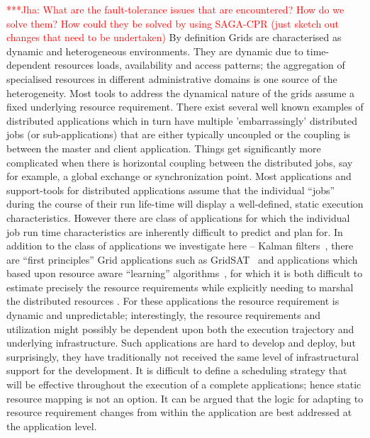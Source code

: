 \documentclass[conference,final]{IEEEtran}
\newcommand{\jhanote}[1]{ {\textcolor{red} { ***Jha: #1 }}}
\begin{document}
\jhanote{What are the fault-tolerance issues that are encountered?
  How do we solve them? How could they be solved by using SAGA-CPR
  (just sketch out changes that need to be undertaken)}
By definition Grids are characterised as dynamic and heterogeneous
environments.  They are dynamic due to time-dependent resources loads,
availability and access patterns; the aggregation of specialised
resources in different administrative domains is one source of the
heterogeneity.  Most tools to address the dynamical nature of the
grids assume a fixed underlying resource requirement.  There exist
several well known examples of distributed applications which in turn
have multiple 'embarrassingly' distributed jobs (or sub-applications)
that are either typically uncoupled or the coupling is between the
master and client application.  Things get significantly more
complicated when there is horizontal coupling between the distributed
jobs, say for example, a global exchange or synchronization point.
Most applications and support-tools for distributed applications
assume that the individual ``jobs'' during the course of their run
life-time will display a well-defined, static execution
characteristics.  However there are class of applications for which
the individual job run time characteristics are inherently difficult
to predict and plan for.  In addition to the class of applications we
investigate here -- Kalman filters~\cite{DataAssim, KalmanPaper},
there are ``first principles'' Grid applications such as
GridSAT~\cite{gridsat03} and applications which based upon resource
aware ``learning'' algorithms~\cite{ majority_voting}, for which it is
both difficult to estimate precisely the resource requirements while
explicitly needing to marshal the distributed resources . For these
applications the resource requirement is dynamic and unpredictable;
interestingly, the resource requirements and utilization might
possibly be dependent upon both the execution trajectory and
underlying infrastructure. Such applications are hard to develop and
deploy, but surprisingly, they have traditionally not received the
same level of infrastructural support for the development. It is
difficult to define a scheduling strategy that will be effective
throughout the execution of a complete applications; hence static
resource mapping is not an option.  It can be argued that the logic
for adapting to resource requirement changes from within the
application are best addressed at the application level.
\end{document}
